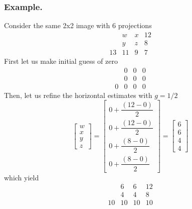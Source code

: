 \documentclass[../../../main.tex]{subfiles}
\begin{document}
\subsubsection{Example.}
Consider the same 2x2 image with 6 projections
\begin{equation*}
    \begin{matrix}
           & w  & x & 12 \\
           & y  & z & 8  \\
        13 & 11 & 9 & 7
    \end{matrix}
\end{equation*}
First let us make initial guess of zero
\begin{equation*}
    \begin{matrix}
          & 0 & 0 & 0 \\
          & 0 & 0 & 0 \\
        0 & 0 & 0 & 0
    \end{matrix}
\end{equation*}
Then, let us refine the horizontal estimates with $g=1/2$
\begin{equation*}
    \begin{bmatrix}
        w \\ x \\ y \\ z
    \end{bmatrix}
    =
    \begin{bmatrix}
        0 + \dfrac{(12 - 0)}{2} \\
        0 + \dfrac{(12 - 0)}{2} \\
        0 + \dfrac{(8 - 0)}{2}  \\
        0 + \dfrac{(8 - 0)}{2}
    \end{bmatrix}
    =
    \begin{bmatrix}
        6 \\ 6 \\ 4 \\ 4
    \end{bmatrix}
\end{equation*}
which yield
\begin{equation*}
    \begin{matrix}
           & 6  & 6  & 12 \\
           & 4  & 4  & 8  \\
        10 & 10 & 10 & 10
    \end{matrix}
\end{equation*}
\end{document}

